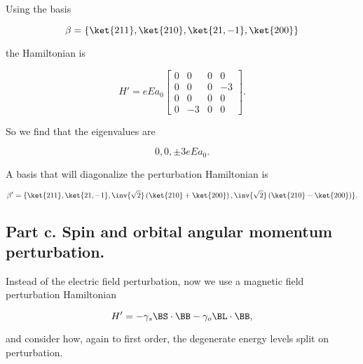 Using the basis

\begin{equation}\label{eqn:qmTwoExamReflection:630}
\beta = \{ 
\ket{211}, \ket{210}, \ket{21,-1}, \ket{200}
\}
\end{equation}

the Hamiltonian is

\begin{equation}\label{eqn:qmTwoExamReflection:650}
H' = 
e E a_0
\begin{bmatrix}
 0 & 0 & 0 & 0 \\
 0 & 0 & 0 & -3 \\
 0 & 0 & 0 & 0 \\
 0 & -3 & 0 & 0 
\end{bmatrix}.
\end{equation}

So we find that the eigenvalues are

\begin{equation}\label{eqn:qmTwoExamReflection:670}
0, 0, \pm 3 e E a_0.
\end{equation}

A basis that will diagonalize the perturbation Hamiltonian is

\begin{equation}\label{eqn:qmTwoExamReflection:690}
\beta' = \{ 
\ket{211}, \ket{21,-1},
\inv{\sqrt{2}} 
\left(\ket{210}
+\ket{200}
\right),
\inv{\sqrt{2}} 
\left(\ket{210}
-\ket{200}
\right)
\}.
\end{equation}


\subsection{Part c.  Spin and orbital angular momentum perturbation.}

Instead of the electric field perturbation, now we use a magnetic field perturbation Hamiltonian

\begin{equation}\label{eqn:qmTwoExamReflection:710}
H' = 
-\gamma_s \BS \cdot \BB 
-\gamma_o \BL \cdot \BB,
\end{equation}

and consider how, again to first order, the degenerate energy levels split on perturbation.

\EndArticle
